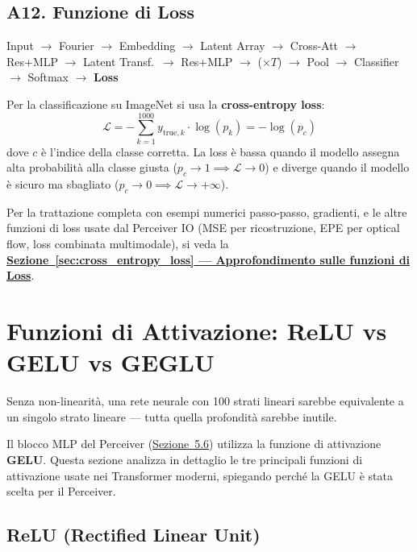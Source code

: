 \documentclass[12pt,a4paper]{article}
\begin{document}
\subsection{A12. Funzione di Loss} \label{sec:loss}

\begin{pipelinebox}
Input $\to$ Fourier $\to$ Embedding $\to$ Latent Array $\to$ Cross-Att $\to$ Res+MLP $\to$ Latent Transf.\ $\to$ Res+MLP $\to$ ($\times T$) $\to$ Pool $\to$ Classifier $\to$ Softmax $\to$ \textbf{Loss}
\end{pipelinebox}

Per la classificazione su ImageNet si usa la \textbf{cross-entropy loss}:
\[
    \mathcal{L} = -\sum_{k=1}^{1000} y_{\text{true},k} \cdot \log(p_k) = -\log(p_c)
\]
dove $c$ \`e l'indice della classe corretta. La loss \`e bassa quando il modello assegna alta probabilit\`a alla classe giusta ($p_c \to 1 \implies \mathcal{L} \to 0$) e diverge quando il modello \`e sicuro ma sbagliato ($p_c \to 0 \implies \mathcal{L} \to +\infty$).

\medskip
\noindent Per la trattazione completa con esempi numerici passo-passo, gradienti, e le altre funzioni di loss usate dal Perceiver IO (MSE per ricostruzione, EPE per optical flow, loss combinata multimodale), si veda la \hyperref[sec:cross_entropy_loss]{\textbf{Sezione~\ref*{sec:cross_entropy_loss} --- Approfondimento sulle funzioni di Loss}}.


\newpage
\section{Funzioni di Attivazione: ReLU vs GELU vs GEGLU} \label{sec:attivazioni}

Senza non-linearit\`a, una rete neurale con 100 strati lineari sarebbe equivalente a un singolo strato lineare --- tutta quella profondit\`a sarebbe inutile.

Il blocco MLP del Perceiver (\hyperref[sec:mlp_forward]{Sezione~5.6}) utilizza la funzione di attivazione \textbf{GELU}. Questa sezione analizza in dettaglio le tre principali funzioni di attivazione usate nei Transformer moderni, spiegando perch\'e la GELU \`e stata scelta per il Perceiver.

\subsection{ReLU (Rectified Linear Unit)} \label{sec:relu}
\end{document}
